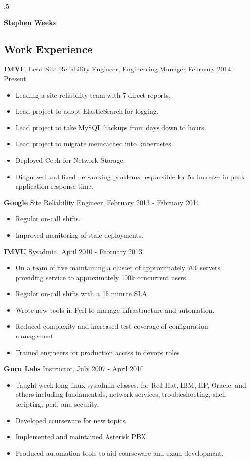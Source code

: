 \documentclass[line]{res}
\begin{document}
\moveleft.5\hoffset\centerline{\Huge\textbf{Stephen Weeks}}

\address{801.634.5859 tene@allalone.org}

\begin{resume}

\section{Work Experience}
\textbf{IMVU} Lead Site Reliability Engineer, Engineering Manager February 2014 - Present
\begin{itemize}
\item Leading a site reliability team with 7 direct reports.
\item Lead project to adopt ElasticSearch for logging.
\item Lead project to take MySQL backups from days down to hours.
\item Lead project to migrate memcached into kubernetes.
\item Deployed Ceph for Network Storage.
\item Diagnosed and fixed networking problems responsible for 5x increase in peak application response time.
\end{itemize}

\textbf{Google} Site Reliability Engineer, February 2013 - February 2014
\begin{itemize}
\item Regular on-call shifts.
\item Improved monitoring of stale deployments.
\end{itemize}

\textbf{IMVU} Sysadmin, April 2010 - February 2013
\begin{itemize}
\item On a team of five maintaining a cluster of approximately 700 servers providing service to approximately 100k concurrent users.
\item Regular on-call shifts with a 15 minute SLA.
\item Wrote new tools in Perl to manage infrastructure and automation.
\item Reduced complexity and increased test coverage of configuration management.
\item Trained engineers for production access in devops roles.
\end{itemize}

\textbf{Guru Labs} Instructor, July 2007 - April 2010
\begin{itemize}
\item Taught week-long linux sysadmin classes, for Red Hat, IBM, HP, Oracle, and others including fundamentals, network services, troubleshooting, shell scripting, perl, and security.
\item Developed courseware for new topics.
\item Implemented and maintained Asterisk PBX.
\item Produced automation tools to aid courseware and exam development.
\end{itemize}


\end{resume}
\end{document}

